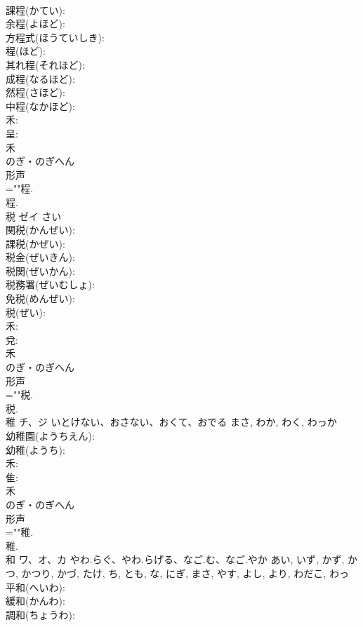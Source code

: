 \documentclass[8pt]{extreport}
\begin{document}
\begin{CJK}{UTF8}{min}
\\	課程(かてい): 
\\	余程(よほど): 
\\	方程式(ほうていしき): 
\\	程(ほど): 
\\	其れ程(それほど): 
\\	成程(なるほど): 
\\	然程(さほど): 
\\	中程(なかほど): 
\\	禾: 
\\	呈: 
\\	禾	
\\	のぎ・のぎへん	
\\	形声 
\\	=""程.
\\	程.
\\	税	ゼイ		さい	
\\	関税(かんぜい): 
\\	課税(かぜい): 
\\	税金(ぜいきん): 
\\	税関(ぜいかん): 
\\	税務署(ぜいむしょ): 
\\	免税(めんぜい): 
\\	税(ぜい): 
\\	禾: 
\\	兌: 
\\	禾	
\\	のぎ・のぎへん	
\\	形声 
\\	=""税.
\\	税.
\\	稚	チ、ジ	いとけない、おさない、おくて、おでる	まさ, わか, わく, わっか	
\\	幼稚園(ようちえん): 
\\	幼稚(ようち): 
\\	禾: 
\\	隹: 
\\	禾	
\\	のぎ・のぎへん	
\\	形声 
\\	=""稚.
\\	稚.
\\	和	ワ、オ、カ	やわ.らぐ、やわ.らげる、なご.む、なご.やか	あい, いず, かず, かつ, かつり, かづ, たけ, ち, とも, な, にぎ, まさ, やす, よし, より, わだこ, わっ	
\\	平和(へいわ): 
\\	緩和(かんわ): 
\\	調和(ちょうわ): 

\end{CJK}
\end{document}
